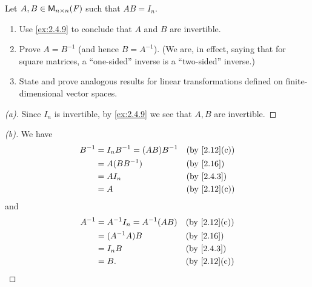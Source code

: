 \begin{ex}\label{ex:2.4.10}
	Let \(A, B \in \ms[n][n][\F]\) such that \(AB = I_n\).
	\begin{enumerate}
		\item Use \cref{ex:2.4.9} to conclude that \(A\) and \(B\) are invertible.
		\item Prove \(A = B^{-1}\) (and hence \(B = A^{-1}\)).
		      (We are, in effect, saying that for square matrices, a ``one-sided'' inverse is a ``two-sided'' inverse.)
		\item State and prove analogous results for linear transformations defined on finite-dimensional vector spaces.
	\end{enumerate}
\end{ex}

\begin{proof}[(a)]
	Since \(I_n\) is invertible, by \cref{ex:2.4.9} we see that \(A, B\) are invertible.
\end{proof}

\begin{proof}[(b)]
	We have
	\begin{align*}
		B^{-1} & = I_n B^{-1} = (AB) B^{-1} &  & \by{2.12}[c] \\
		       & = A (B B^{-1})             &  & \by{2.16}    \\
		       & = A I_n                    &  & \by{2.4.3}   \\
		       & = A                        &  & \by{2.12}[c]
	\end{align*}
	and
	\begin{align*}
		A^{-1} & = A^{-1} I_n = A^{-1} (AB) &  & \by{2.12}[c] \\
		       & = (A^{-1} A) B             &  & \by{2.16}    \\
		       & = I_n B                    &  & \by{2.4.3}   \\
		       & = B.                       &  & \by{2.12}[c]
	\end{align*}
\end{proof}

